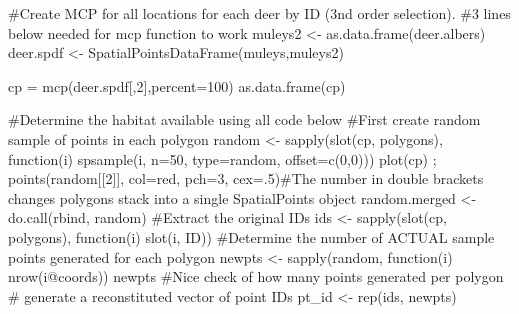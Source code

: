 \documentclass[
  letterpaper,
]{book}
\newenvironment{Shaded}{\begin{snugshade}}{\end{snugshade}}
\newcommand{\AttributeTok}[1]{\textcolor[rgb]{0.40,0.45,0.13}{#1}}
\newcommand{\CommentTok}[1]{\textcolor[rgb]{0.37,0.37,0.37}{#1}}
\newcommand{\ControlFlowTok}[1]{\textcolor[rgb]{0.00,0.23,0.31}{#1}}
\newcommand{\DecValTok}[1]{\textcolor[rgb]{0.68,0.00,0.00}{#1}}
\newcommand{\FunctionTok}[1]{\textcolor[rgb]{0.28,0.35,0.67}{#1}}
\newcommand{\NormalTok}[1]{\textcolor[rgb]{0.00,0.23,0.31}{#1}}
\newcommand{\OtherTok}[1]{\textcolor[rgb]{0.00,0.23,0.31}{#1}}
\newcommand{\SpecialCharTok}[1]{\textcolor[rgb]{0.37,0.37,0.37}{#1}}
\newcommand{\StringTok}[1]{\textcolor[rgb]{0.13,0.47,0.30}{#1}}
\begin{document}
\begin{Shaded}
\begin{Highlighting}[]
\CommentTok{\#Create MCP for all locations for each deer by ID (3nd order selection).}
\CommentTok{\#3 lines below needed for mcp function to work}
\NormalTok{muleys2 }\OtherTok{\textless{}{-}} \FunctionTok{as.data.frame}\NormalTok{(deer.albers)}
\NormalTok{deer.spdf }\OtherTok{\textless{}{-}} \FunctionTok{SpatialPointsDataFrame}\NormalTok{(muleys,muleys2)}

\NormalTok{cp }\OtherTok{=} \FunctionTok{mcp}\NormalTok{(deer.spdf[,}\DecValTok{2}\NormalTok{],}\AttributeTok{percent=}\DecValTok{100}\NormalTok{)}
\FunctionTok{as.data.frame}\NormalTok{(cp)}

\CommentTok{\#Determine the habitat available using all code below}
\CommentTok{\#First create random sample of points in each polygon}
\NormalTok{random }\OtherTok{\textless{}{-}} \FunctionTok{sapply}\NormalTok{(}\FunctionTok{slot}\NormalTok{(cp, }\StringTok{\textquotesingle{}polygons\textquotesingle{}}\NormalTok{), }\ControlFlowTok{function}\NormalTok{(i) }\FunctionTok{spsample}\NormalTok{(i, }\AttributeTok{n=}\DecValTok{50}\NormalTok{, }\AttributeTok{type=}\StringTok{\textquotesingle{}random\textquotesingle{}}\NormalTok{, }\AttributeTok{offset=}\FunctionTok{c}\NormalTok{(}\DecValTok{0}\NormalTok{,}\DecValTok{0}\NormalTok{)))}
\FunctionTok{plot}\NormalTok{(cp) ; }\FunctionTok{points}\NormalTok{(random[[}\DecValTok{2}\NormalTok{]], }\AttributeTok{col=}\StringTok{\textquotesingle{}red\textquotesingle{}}\NormalTok{, }\AttributeTok{pch=}\DecValTok{3}\NormalTok{, }\AttributeTok{cex=}\NormalTok{.}\DecValTok{5}\NormalTok{)}\CommentTok{\#The number in double brackets changes polygons stack into a single SpatialPoints object}
\NormalTok{random.merged }\OtherTok{\textless{}{-}} \FunctionTok{do.call}\NormalTok{(}\StringTok{\textquotesingle{}rbind\textquotesingle{}}\NormalTok{, random)}
\CommentTok{\#Extract the original IDs}
\NormalTok{ids }\OtherTok{\textless{}{-}} \FunctionTok{sapply}\NormalTok{(}\FunctionTok{slot}\NormalTok{(cp, }\StringTok{\textquotesingle{}polygons\textquotesingle{}}\NormalTok{), }\ControlFlowTok{function}\NormalTok{(i) }\FunctionTok{slot}\NormalTok{(i, }\StringTok{\textquotesingle{}ID\textquotesingle{}}\NormalTok{))}
\CommentTok{\#Determine the number of ACTUAL sample points generated for each polygon}
\NormalTok{newpts }\OtherTok{\textless{}{-}} \FunctionTok{sapply}\NormalTok{(random, }\ControlFlowTok{function}\NormalTok{(i) }\FunctionTok{nrow}\NormalTok{(i}\SpecialCharTok{@}\NormalTok{coords))}
\NormalTok{newpts }\CommentTok{\#Nice check of how many points generated per polygon }
\CommentTok{\# generate a reconstituted vector of point IDs}
\NormalTok{pt\_id }\OtherTok{\textless{}{-}} \FunctionTok{rep}\NormalTok{(ids, newpts)}
 

\end{Highlighting}
\end{Shaded}
\end{document}
